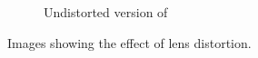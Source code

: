 \begin{figure}[H]
\begin{subfigure}[b]{0.45\textwidth}
        \caption{Undistorted version of }
        \label{fig:undistorted-checkerboard}
    \end{subfigure}
    \captionsetup{singlelinecheck = false, justification=justified}
    \caption{Images showing the effect of lens distortion.}
    \label{fig:checkerboard-distortion}
\end{figure}


\pendsign